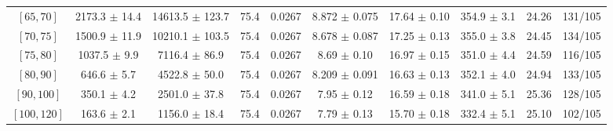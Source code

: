 \begin{tabular}{c||c|c|c|c|c|c|c||c|c}
$[65, 70]$ & 2173.3 $\pm$ 14.4 & 14613.5 $\pm$ 123.7 & 75.4 & 0.0267 & 8.872 $\pm$ 0.075 & 17.64 $\pm$ 0.10 & 354.9 $\pm$ 3.1 & 24.26 & 131/105\\
$[70, 75]$ & 1500.9 $\pm$ 11.9 & 10210.1 $\pm$ 103.5 & 75.4 & 0.0267 & 8.678 $\pm$ 0.087 & 17.25 $\pm$ 0.13 & 355.0 $\pm$ 3.8 & 24.45 & 134/105\\
$[75, 80]$ & 1037.5 $\pm$ 9.9 & 7116.4 $\pm$ 86.9 & 75.4 & 0.0267 & 8.69 $\pm$ 0.10 & 16.97 $\pm$ 0.15 & 351.0 $\pm$ 4.4 & 24.59 & 116/105\\
$[80, 90]$ & 646.6 $\pm$ 5.7 & 4522.8 $\pm$ 50.0 & 75.4 & 0.0267 & 8.209 $\pm$ 0.091 & 16.63 $\pm$ 0.13 & 352.1 $\pm$ 4.0 & 24.94 & 133/105\\
$[90, 100]$ & 350.1 $\pm$ 4.2 & 2501.0 $\pm$ 37.8 & 75.4 & 0.0267 & 7.95 $\pm$ 0.12 & 16.59 $\pm$ 0.18 & 341.0 $\pm$ 5.1 & 25.36 & 128/105\\
$[100, 120]$ & 163.6 $\pm$ 2.1 & 1156.0 $\pm$ 18.4 & 75.4 & 0.0267 & 7.79 $\pm$ 0.13 & 15.70 $\pm$ 0.18 & 332.4 $\pm$ 5.1 & 25.10 & 102/105\\
\end{tabular}
